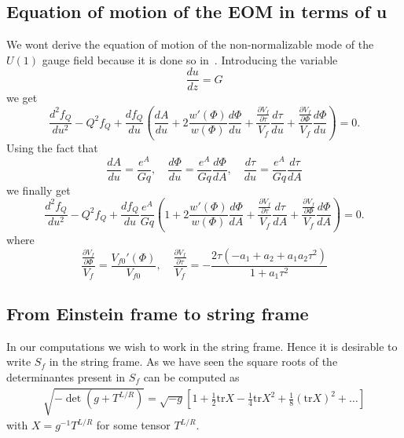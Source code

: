 \documentclass[10 pt]{article}
\begin{document}
\subsection{Equation of motion of the EOM in terms of u}
We wont derive the equation of motion of the non-normalizable mode of the $U\left(1\right)$ gauge field because it is done so in~\cite{Arean:2013tja}. Introducing the variable
\begin{equation}
\frac{du}{dz} = G
\end{equation}
we get
\begin{equation}
\frac{d^2 f_Q}{d u^2} - Q^2 f_Q + \frac{d f_Q}{du} \left( \frac{dA}{du} + 2 \frac{w'\left(\Phi\right)}{w\left(\Phi\right)} \frac{d\Phi}{du} + \frac{\frac{\partial V_f}{\partial \tau}}{V_f} \frac{d\tau}{du} +  \frac{\frac{\partial V_f}{\partial \Phi}}{V_f} \frac{d\Phi}{du} \right) = 0.
\end{equation}
Using the fact that
\begin{equation}
\frac{dA}{du} = \frac{e^A}{G q} , \quad  \frac{d\Phi}{du} = \frac{e^A}{G q} \frac{d\Phi}{dA} , \quad \frac{d\tau}{du} = \frac{e^A}{G q} \frac{d\tau}{dA}
\end{equation}
we finally get
\begin{equation}
\frac{d^2 f_Q}{d u^2} - Q^2 f_Q + \frac{d f_Q}{du} \frac{e^A}{G q} \left(1 + 2 \frac{w'\left(\Phi\right)}{w\left(\Phi\right)} \frac{d\Phi}{dA} + \frac{\frac{\partial V_f}{\partial \tau}}{V_f} \frac{d\tau}{dA} +  \frac{\frac{\partial V_f}{\partial \Phi}}{V_f} \frac{d\Phi}{dA} \right) = 0.
\end{equation}
where
\begin{equation}
 \frac{\frac{\partial V_f}{\partial \Phi}}{V_f} = \frac{V_{f0}'\left(\Phi\right)}{V_{f0}}, \quad   \frac{\frac{\partial V_f}{\partial \tau}}{V_f} = - \frac{2\tau\left( -a_1 + a_2 + a_1 a_2 \tau^2\right)}{1 +a_1 \tau^2}
\end{equation}

\subsection{From Einstein frame to string frame}

In our computations we wish to work in the string frame. Hence it is desirable to write $S_f$ in the string frame. As we have seen the square roots of the determinantes present in $S_f$ can be computed as
\begin{align}
\sqrt{-\det \left( g + T^{L/R} \right)} = \sqrt{-g} \left[ 1 + \frac{1}{2} \text{tr} X - \frac{1}{4} \text{tr} X^2 + \frac{1}{8} {\left( \text{tr} X \right)}^2 + \dots \right]
\end{align}
with $X = g^{-1} T^{L/R}$ for some tensor $T^{L/R}$.
\end{document}
